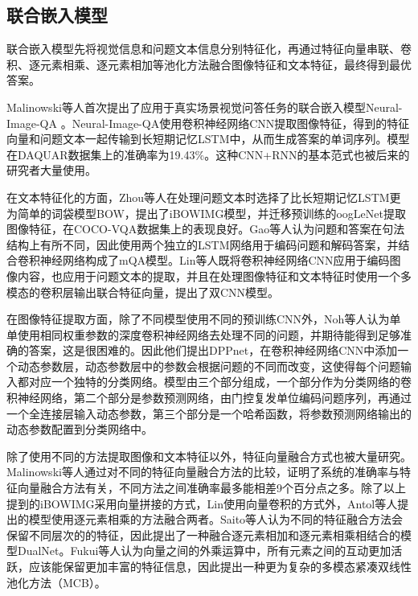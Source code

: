 \subsection{联合嵌入模型}
联合嵌入模型先将视觉信息和问题文本信息分别特征化，再通过特征向量串联、卷积、逐元素相乘、逐元素相加等池化方法融合图像特征和文本特征，最终得到最优答案。

Malinowski等人首次提出了应用于真实场景视觉问答任务的联合嵌入模型Neural-Image-QA
。Neural-Image-QA使用卷积神经网络CNN提取图像特征，得到的特征向量和问题文本一起传输到长短期记忆LSTM中，从而生成答案的单词序列。模型在DAQUAR数据集上的准确率为19.43\%。这种CNN+RNN的基本范式也被后来的研究者大量使用。

在文本特征化的方面，Zhou等人在处理问题文本时选择了比长短期记忆LSTM更为简单的词袋模型BOW，提出了iBOWIMG模型，并迁移预训练的oogLeNet提取图像特征，在COCO-VQA数据集上的表现良好。Gao等人认为问题和答案在句法结构上有所不同，因此使用两个独立的LSTM网络用于编码问题和解码答案，并结合卷积神经网络构成了mQA模型。Lin等人既将卷积神经网络CNN应用于编码图像内容，也应用于问题文本的提取，并且在处理图像特征和文本特征时使用一个多模态的卷积层输出联合特征向量，提出了双CNN模型。

在图像特征提取方面，除了不同模型使用不同的预训练CNN外，Noh等人认为单单使用相同权重参数的深度卷积神经网络去处理不同的问题，并期待能得到足够准确的答案，这是很困难的。因此他们提出DPPnet，在卷积神经网络CNN中添加一个动态参数层，动态参数层中的参数会根据问题的不同而改变，这使得每个问题输入都对应一个独特的分类网络。模型由三个部分组成，一个部分作为分类网络的卷积神经网络，第二个部分是参数预测网络，由门控复发单位编码问题序列，再通过一个全连接层输入动态参数，第三个部分是一个哈希函数，将参数预测网络输出的动态参数配置到分类网络中。

除了使用不同的方法提取图像和文本特征以外，特征向量融合方式也被大量研究。Malinowski等人通过对不同的特征向量融合方法的比较，证明了系统的准确率与特征向量融合方法有关，不同方法之间准确率最多能相差9个百分点之多。除了以上提到的iBOWIMG采用向量拼接的方式，Lin使用向量卷积的方式外，Antol等人提出的模型使用逐元素相乘的方法融合两者。Saito等人认为不同的特征融合方法会保留不同层次的的特征，因此提出了一种融合逐元素相加和逐元素相乘相结合的模型DualNet。Fukui等人认为向量之间的外乘运算中，所有元素之间的互动更加活跃，应该能保留更加丰富的特征信息，因此提出一种更为复杂的多模态紧凑双线性池化方法（MCB）。

